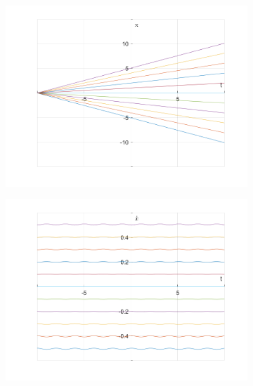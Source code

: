 \documentclass{article}
\begin{document}
	\begin{figure}[h!]
		\centering
		\begin{subfigure}[b]{0.48\linewidth}
			\includegraphics[width=\linewidth]{./SmallOscillations/S7/F3.png}
		\end{subfigure}
		\begin{subfigure}[b]{0.48\linewidth}
			\includegraphics[width=\linewidth]{./SmallOscillations/S7/F4.png}
		\end{subfigure}
	\end{figure}
\end{document}

